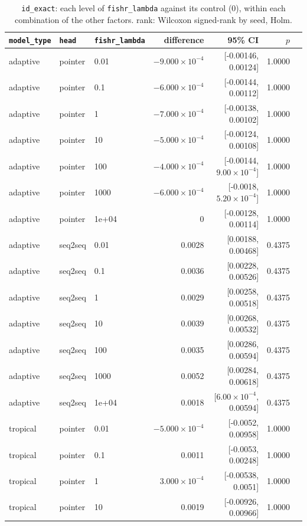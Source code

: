 \documentclass[10pt]{article}
\begin{document}
{\small
\begin{longtable}{lllrrrl}
\caption{\texttt{id\_exact}: each level of \texttt{fishr\_lambda} against its control (0), within each combination of the other factors. rank: Wilcoxon signed-rank by seed, Holm.}\label{tab:control-id_exact}\\
\toprule
\texttt{model\_type} & \texttt{head} & \texttt{fishr\_lambda} & difference & 95\% CI & $p$ & \\
\midrule
\endhead
adaptive & pointer & 0.01 & $-9.000\times10^{-4}$ & [-0.00146, 0.00124] & 1.0000 & \\
adaptive & pointer & 0.1 & $-6.000\times10^{-4}$ & [-0.00144, 0.00112] & 1.0000 & \\
adaptive & pointer & 1 & $-7.000\times10^{-4}$ & [-0.00138, 0.00102] & 1.0000 & \\
adaptive & pointer & 10 & $-5.000\times10^{-4}$ & [-0.00124, 0.00108] & 1.0000 & \\
adaptive & pointer & 100 & $-4.000\times10^{-4}$ & [-0.00144, $9.00\times10^{-4}$] & 1.0000 & \\
adaptive & pointer & 1000 & $-6.000\times10^{-4}$ & [-0.0018, $5.20\times10^{-4}$] & 1.0000 & \\
adaptive & pointer & 1e+04 & 0 & [-0.00128, 0.00114] & 1.0000 & \\
adaptive & seq2seq & 0.01 & 0.0028 & [0.00188, 0.00468] & 0.4375 & \\
adaptive & seq2seq & 0.1 & 0.0036 & [0.00228, 0.00526] & 0.4375 & \\
adaptive & seq2seq & 1 & 0.0029 & [0.00258, 0.00518] & 0.4375 & \\
adaptive & seq2seq & 10 & 0.0039 & [0.00268, 0.00532] & 0.4375 & \\
adaptive & seq2seq & 100 & 0.0035 & [0.00286, 0.00594] & 0.4375 & \\
adaptive & seq2seq & 1000 & 0.0052 & [0.00284, 0.00618] & 0.4375 & \\
adaptive & seq2seq & 1e+04 & 0.0018 & [$6.00\times10^{-4}$, 0.00594] & 0.4375 & \\
tropical & pointer & 0.01 & $-5.000\times10^{-4}$ & [-0.0052, 0.00958] & 1.0000 & \\
tropical & pointer & 0.1 & 0.0011 & [-0.0053, 0.00248] & 1.0000 & \\
tropical & pointer & 1 & $3.000\times10^{-4}$ & [-0.00538, 0.0051] & 1.0000 & \\
tropical & pointer & 10 & 0.0019 & [-0.00926, 0.00966] & 1.0000 & \\

\end{longtable}}
\end{document}
